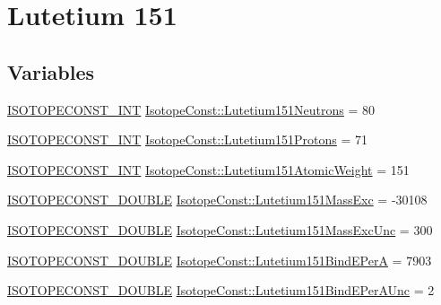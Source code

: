 \hypertarget{group___isotope_const-_lutetium-_lu151}{}\section{Lutetium 151}
\label{group___isotope_const-_lutetium-_lu151}
\subsection*{Variables}
\begin{DoxyCompactItemize}
\item 
\mbox{\hyperlink{group___isotope_const-_macros_ga5f18360b3e99483a35c32d789e62621c}{I\+S\+O\+T\+O\+P\+E\+C\+O\+N\+S\+T\+\_\+\+I\+NT}} \mbox{\hyperlink{group___isotope_const-_lutetium-_lu151_gae2bd0b965a56dfcf9464d304583c7c20}{Isotope\+Const\+::\+Lutetium151\+Neutrons}} = 80
\item 
\mbox{\hyperlink{group___isotope_const-_macros_ga5f18360b3e99483a35c32d789e62621c}{I\+S\+O\+T\+O\+P\+E\+C\+O\+N\+S\+T\+\_\+\+I\+NT}} \mbox{\hyperlink{group___isotope_const-_lutetium-_lu151_gaa51454e7aacfa0a498d1179e874179e3}{Isotope\+Const\+::\+Lutetium151\+Protons}} = 71
\item 
\mbox{\hyperlink{group___isotope_const-_macros_ga5f18360b3e99483a35c32d789e62621c}{I\+S\+O\+T\+O\+P\+E\+C\+O\+N\+S\+T\+\_\+\+I\+NT}} \mbox{\hyperlink{group___isotope_const-_lutetium-_lu151_ga6f138432fa9b2ffe2d679f73cb15fd2b}{Isotope\+Const\+::\+Lutetium151\+Atomic\+Weight}} = 151
\item 
\mbox{\hyperlink{group___isotope_const-_macros_ga8f45a7272ce02c0b4c65c44636ed719a}{I\+S\+O\+T\+O\+P\+E\+C\+O\+N\+S\+T\+\_\+\+D\+O\+U\+B\+LE}} \mbox{\hyperlink{group___isotope_const-_lutetium-_lu151_ga3619118c7715f7bee0afcdbccd0d39b0}{Isotope\+Const\+::\+Lutetium151\+Mass\+Exc}} = -\/30108
\item 
\mbox{\hyperlink{group___isotope_const-_macros_ga8f45a7272ce02c0b4c65c44636ed719a}{I\+S\+O\+T\+O\+P\+E\+C\+O\+N\+S\+T\+\_\+\+D\+O\+U\+B\+LE}} \mbox{\hyperlink{group___isotope_const-_lutetium-_lu151_gaca33338cf88482ce931f3b65823d052b}{Isotope\+Const\+::\+Lutetium151\+Mass\+Exc\+Unc}} = 300
\item 
\mbox{\hyperlink{group___isotope_const-_macros_ga8f45a7272ce02c0b4c65c44636ed719a}{I\+S\+O\+T\+O\+P\+E\+C\+O\+N\+S\+T\+\_\+\+D\+O\+U\+B\+LE}} \mbox{\hyperlink{group___isotope_const-_lutetium-_lu151_ga0ea593922e5327190d3067fcaf6ff1d2}{Isotope\+Const\+::\+Lutetium151\+Bind\+E\+PerA}} = 7903
\item 
\mbox{\hyperlink{group___isotope_const-_macros_ga8f45a7272ce02c0b4c65c44636ed719a}{I\+S\+O\+T\+O\+P\+E\+C\+O\+N\+S\+T\+\_\+\+D\+O\+U\+B\+LE}} \mbox{\hyperlink{group___isotope_const-_lutetium-_lu151_ga5a01ff132cd1c3ab1d8726b499fb2fae}{Isotope\+Const\+::\+Lutetium151\+Bind\+E\+Per\+A\+Unc}} = 2

\end{DoxyCompactItemize}
